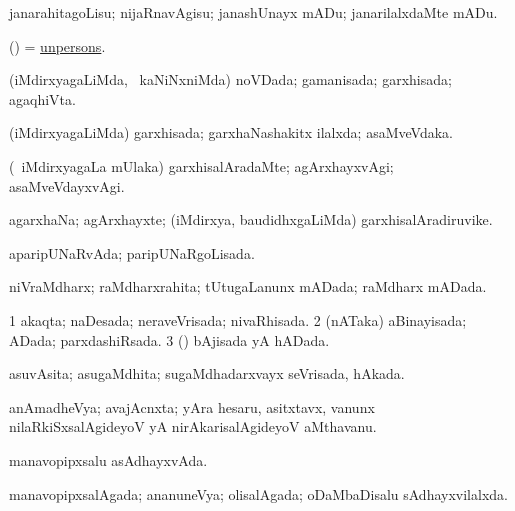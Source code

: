 \bentry
{} 
\gl{\sakirx}
\expl{}
\bmng
janarahitagoLisu; nijaRnavAgisu; janashUnayx mADu; janarilalxdaMte mADu. 
\emng
\eentry

\bentry
{} 
\gl{\nA}
\expl{}
\bmng
(\bava) = \hyperlink{unperson}{unpersons}. 
\emng
\eentry

\bentry
{} 
\gl{\gu}
\expl{}
\bmng
(iMdirxyagaLiMda, \kanmu\ kaNiNxniMda) noVDada; gamanisada; garxhisada; agaqhiVta. 
\emng
\eentry

\bentry
{} 
\gl{\gu}
\expl{}
\bmng
(iMdirxyagaLiMda) garxhisada; garxhaNashakitx ilalxda; asaMveVdaka. 
\emng
\eentry

\bentry
{} 
\gl{\kirxvi}
\expl{}
\bmng
(\kanmu\ iMdirxyagaLa mUlaka) garxhisalAradaMte; agArxhayxvAgi; asaMveVdayxvAgi. 
\emng
\eentry

\bentry
{} 
\gl{\nA}
\expl{}
\bmng
agarxhaNa; agArxhayxte; (iMdirxya, baudidhxgaLiMda) garxhisalAradiruvike. 
\emng
\eentry

\bentry
{} 
\gl{\gu}
\expl{}
\bmng
aparipUNaRvAda; paripUNaRgoLisada. 
\emng
\eentry

\bentry
{} 
\gl{\gu}
\expl{}
\bmng
niVraMdharx; raMdharxrahita; tUtugaLanunx mADada; raMdharx mADada. 
\emng
\eentry

\bentry
{} 
\gl{\gu}
\expl{}
\bmng
\bnum
\num{1} akaqta; naDesada; neraveVrisada; nivaRhisada. 
\num{2} (nATaka) aBinayisada; ADada; parxdashiRsada. 
\num{3} (\saM) bAjisada yA hADada. 
\enum
\emng
\eentry

\bentry
{} 
\gl{\gu}
\expl{}
\bmng
asuvAsita; asugaMdhita; sugaMdhadarxvayx seVrisada, hAkada. 
\emng
\eentry

\bentry
{} 
\gl{\nA}
\expl{}
\bmng
anAmadheVya; avajAcnxta; yAra hesaru, asitxtavx, \mo vanunx nilaRkiSxsalAgideyoV yA nirAkarisalAgideyoV aMthavanu. 
\emng
\eentry

\bentry
{} 
\gl{\gu}
\expl{}
\bmng
manavopipxsalu asAdhayxvAda. 
\emng
\eentry

\bentry
{} 
\gl{\gu}
\expl{}
\bmng
manavopipxsalAgada; ananuneVya; olisalAgada; oDaMbaDisalu sAdhayxvilalxda. 
\emng
\eentry

